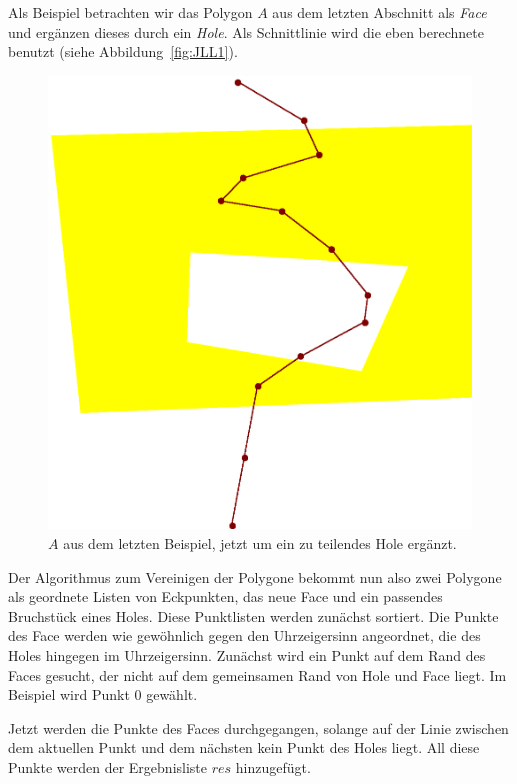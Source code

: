Als Beispiel betrachten wir das Polygon $A$ aus dem letzten Abschnitt als \textit{Face} und ergänzen dieses durch ein \textit{Hole}. Als Schnittlinie wird die eben berechnete benutzt (siehe Abbildung~\vref{fig:JLL1}).

\begin{figure}
	\centering
	\includegraphics[scale=0.6]{JLL1.svg.eps}
	\caption[Ein Face mit einem Hole wird geteilt]{$A$ aus dem letzten Beispiel, jetzt um ein zu teilendes Hole ergänzt.}
	\label{fig:JLL1}
\end{figure}

Der Algorithmus zum Vereinigen der Polygone bekommt nun also zwei Polygone als geordnete Listen von Eckpunkten, das neue Face und ein passendes Bruchstück eines Holes. Diese Punktlisten werden zunächst sortiert. Die Punkte des Face werden wie gewöhnlich gegen den Uhrzeigersinn  angeordnet, die des Holes hingegen im Uhrzeigersinn. Zunächst wird  ein Punkt auf dem Rand des Faces gesucht, der nicht auf dem gemeinsamen Rand von Hole und Face liegt. Im Beispiel wird Punkt 0 gewählt.

Jetzt werden die Punkte des Faces durchgegangen, solange auf der Linie zwischen dem aktuellen Punkt und dem nächsten kein Punkt des Holes liegt. All diese Punkte werden der Ergebnisliste $res$ hinzugefügt.


